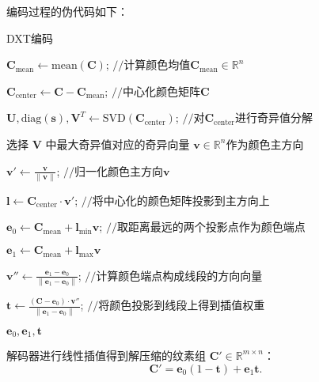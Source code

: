 编码过程的伪代码如下：

\begin{algorithm}[H]
    \caption{DXT编码}
    
    $\mathbf{C}_{\text{mean}} \gets \text{mean}(\mathbf{C})$; \hfill $//$计算颜色均值$\mathbf{C}_{\text{mean}}\in\mathbb{R}^{n}$
    
    $\mathbf{C}_{\text{center}} \gets \mathbf{C} - \mathbf{C}_{\text{mean}}$; \hfill $//$中心化颜色矩阵$\mathbf{C}$
    
    $ \mathbf{U}, \text{diag}(\mathbf{s}), \mathbf{V}^T \gets \text{SVD}(\mathbf{C}_{\text{center}})$; \hfill $//$对$\mathbf{C}_{\text{center}}$进行奇异值分解
    
    选择 $\mathbf{V}$ 中最大奇异值对应的奇异向量 $\mathbf{v} \in \mathbb{R}^{n}$作为颜色主方向\;
    
    $\mathbf{v}' \gets \frac{\mathbf{v}}{\|\mathbf{v}\|}$; \hfill $//$归一化颜色主方向$\mathbf{v}$
    
    $\mathbf{l} \gets \mathbf{C}_{\text{center}} \cdot \mathbf{v}'$; \hfill $//$将中心化的颜色矩阵投影到主方向上
    
    $\mathbf{e}_0 \gets \mathbf{C}_{\text{mean}} + \mathbf{l}_{\text{min}} \mathbf{v}$; \hfill $//$取距离最远的两个投影点作为颜色端点

    $\mathbf{e}_1 \gets \mathbf{C}_{\text{mean}} + \mathbf{l}_{\text{max}} \mathbf{v}$\;
    
    $\mathbf{v''} \gets \frac{\mathbf{e}_1 - \mathbf{e}_0}{\|\mathbf{e}_1 - \mathbf{e}_0\|}$; \hfill $//$计算颜色端点构成线段的方向向量
    
    $\mathbf{t} \gets \frac{(\mathbf{C} - \mathbf{e}_0) \cdot \mathbf{v''}}{\|\mathbf{e}_1 - \mathbf{e}_0\|}$; \hfill $//$将颜色投影到线段上得到插值权重
    
    \Return $\mathbf{e}_0,\mathbf{e}_1,\mathbf{t}$\;
\end{algorithm}

解码器进行线性插值得到解压缩的纹素组 $\mathbf{C}'\in\mathbb{R}^{m\times n}$：
\begin{equation}
\mathbf{C}'=\mathbf{e}_0(1-\mathbf{t})+\mathbf{e}_1\mathbf{t}.
\end{equation}

